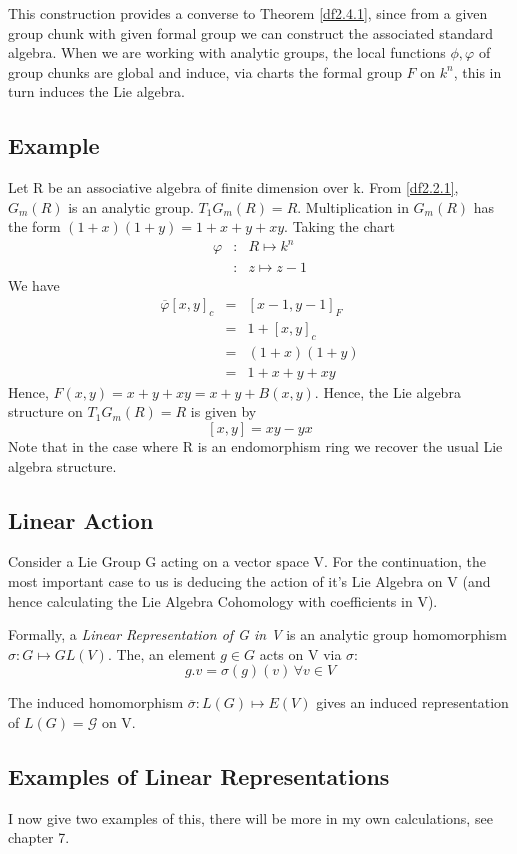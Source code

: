 This construction provides a converse to Theorem \ref{df2.4.1},
since from a given group chunk with given formal group we can
construct the associated standard algebra. When we are working
with analytic groups, the local functions $\phi, \varphi$ of group
chunks are global and induce, via charts the formal group $F$ on
$k^n$, this in turn induces the Lie algebra.

\subsection*{Example}

Let R be an associative algebra of finite dimension over k. From
\ref{df2.2.1}, $G_m(R)$ is an analytic group. $T_1G_m(R) = R$.
Multiplication in $G_m(R)$ has the form $(1+x)(1+y)=1+x+y+xy$.
Taking the chart
\begin{eqnarray}
\nonumber\varphi &:& R\mapsto k^n\\
\nonumber &:&z\mapsto z-1
\end{eqnarray}
We have
\begin{eqnarray}
\nonumber \overline{\varphi}{[x,y]}_c &=& {[x-1,y-1]}_F\\
\nonumber          &=& 1+{[x,y]}_c \\
\nonumber          &=& (1+x)(1+y)\\
\nonumber          &=& 1+x+y+xy
\end{eqnarray}
Hence, \emph{$F(x,y)=x+y+xy = x+y+B(x,y)$}. Hence, the Lie algebra
structure on $T_1G_m(R) =R$ is given by
$$[x,y]=xy-yx$$
Note that in the case where R is an endomorphism ring we recover
the usual Lie algebra structure.

\subsection{Linear Action}\label{df2.5.3}
Consider a Lie Group G acting on a vector space V. For the
continuation, the most important case to us is deducing the action
of it's Lie Algebra on V (and hence calculating the Lie Algebra
Cohomology with coefficients in V).

Formally, a \emph{Linear Representation of G in V} is an analytic
group homomorphism $\sigma: G\mapsto GL(V)$. The, an element $g\in
G$ acts on V via $\sigma$:
$$g.v = \sigma(g)(v)\,\forall v\in V$$

The induced homomorphism $\overline\sigma : L(G)\mapsto E(V)$
gives an induced representation of $L(G)=\mathcal G$ on V.

\subsection{Examples of Linear Representations}\label{df2.5.4}
I now give two examples of this, there will be more in my own
calculations, see chapter 7.

